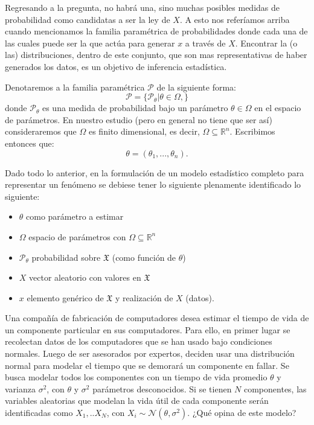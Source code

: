 Regresando a la pregunta, no habrá una, sino muchas posibles medidas de probabilidad como candidatas a ser la ley de ${X}$. A esto nos referíamos arriba cuando mencionamos la familia paramétrica de probabilidades donde cada una de las cuales puede ser la que actúa para generar $x$ a través de ${X}$. Encontrar la (o las) distribuciones, dentro de este conjunto, que son mas representativas de haber generados los datos, es un objetivo de inferencia estadística. 

Denotaremos a la familia paramétrica $\mathcal{P}$ de la siguiente forma:
\[\mathcal{P} = \{\mathcal{P}_\theta | \theta \in \Omega, \}\]
donde $\mathcal{P}_\theta $ es una medida de probabilidad bajo un parámetro $\theta \in \Omega$ en el espacio de parámetros. En nuestro estudio (pero en general no tiene que ser así) consideraremos que $\Omega$ es finito dimensional, es decir, $\Omega \subseteq \mathbb{R}^n$. Escribimos entonces que:
\[\theta = (\theta_1, ..., \theta_n). \]


Dado todo lo anterior, en la formulación de un modelo estadístico completo para representar un fenómeno se debiese tener lo siguiente plenamente identificado lo siguiente:

\begin{itemize}
    \item $\theta$ como parámetro a estimar
    \item $\Omega$ espacio de parámetros con $\Omega \subseteq \mathbb{R}^n$
    \item $\mathcal{P}_\theta$ probabilidad sobre $\mathfrak{X}$ (como función de $\theta$)
    \item ${X}$ vector aleatorio con valores en $\mathfrak{X}$
    \item $x$ elemento genérico de $\mathfrak{X}$ y realización de $X$ (datos).
\end{itemize}

\begin{example}
Una compañía de fabricación de computadores desea estimar el tiempo de vida de un componente particular en sus computadores. Para ello, en primer lugar se recolectan datos de los computadores que se han usado bajo condiciones normales. Luego de ser asesorados por expertos, deciden usar una distribución normal para modelar el tiempo que se demorará un componente en fallar. Se busca modelar todos los componentes con un tiempo de vida promedio $\theta$ y varianza $\sigma
^2$, con $\theta$ y $\sigma^{2}$  parámetros desconocidos. Si se tienen $N$ componentes, las variables aleatorias que modelan la vida útil de cada componente serán identificadas como 
$X_1,..X_N$, con $X_i \sim \mathcal{N}(\theta,\sigma^{2})$. ¿Qué opina de este modelo?
\end{example}

